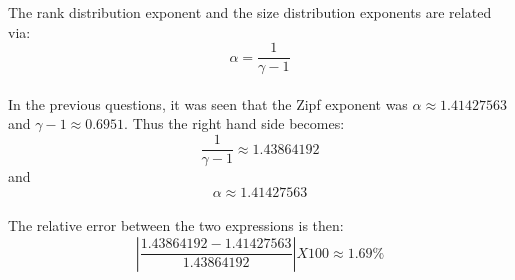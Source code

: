 \documentclass{article}
\begin{document}
The rank distribution exponent and the size distribution exponents are related via: \\
\[ \alpha = \frac{1}{\gamma-1} \]
\\
In the previous questions, it was seen that the Zipf exponent was $\alpha \approx 1.41427563$ and $\gamma-1 \approx 0.6951$. Thus the right hand side becomes:
\[ \frac{1}{\gamma-1} \approx 1.43864192\]
and
\[ \alpha \approx 1.41427563 \]
\\
The relative error between the two expressions is then:
\[ | \frac{1.43864192 - 1.41427563}{1.43864192}| X 100 \approx 1.69 \%\]
\end{document}

